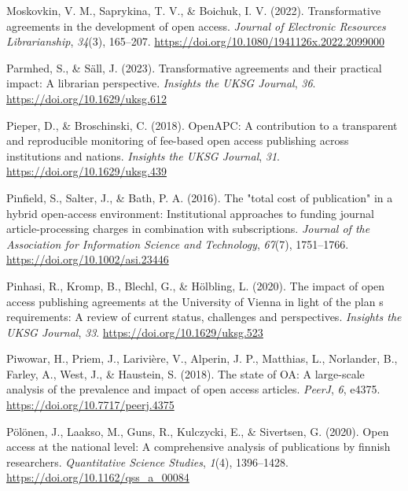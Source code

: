 \documentclass[a4paper,man,floatsintext,longtable,noextraspace,12pt]{apa6}
\newenvironment{CSLReferences}%
  {}%
  {\par}
\begin{document}
\begin{CSLReferences}{1}{0}
\leavevmode{}%
Moskovkin, V. M., Saprykina, T. V., \& Boichuk, I. V. (2022).
Transformative agreements in the development of open access.
\emph{Journal of Electronic Resources Librarianship}, \emph{34}(3),
165--207. \url{https://doi.org/10.1080/1941126x.2022.2099000}

\leavevmode{}%
Parmhed, S., \& Säll, J. (2023). Transformative agreements and their
practical impact: A librarian perspective. \emph{Insights the UKSG
Journal}, \emph{36}. \url{https://doi.org/10.1629/uksg.612}

\leavevmode{}%
Pieper, D., \& Broschinski, C. (2018). {OpenAPC}: A contribution to a
transparent and reproducible monitoring of fee-based open access
publishing across institutions and nations. \emph{Insights the {UKSG}
Journal}, \emph{31}. \url{https://doi.org/10.1629/uksg.439}

\leavevmode{}%
Pinfield, S., Salter, J., \& Bath, P. A. (2016). The "total cost of
publication" in a hybrid open-access environment: Institutional
approaches to funding journal article-processing charges in combination
with subscriptions. \emph{Journal of the Association for Information
Science and Technology}, \emph{67}(7), 1751--1766.
\url{https://doi.org/10.1002/asi.23446}

\leavevmode{}%
Pinhasi, R., Kromp, B., Blechl, G., \& Hölbling, L. (2020). The impact
of open access publishing agreements at the {University of Vienna} in
light of the plan s requirements: A review of current status, challenges
and perspectives. \emph{Insights the UKSG Journal}, \emph{33}.
\url{https://doi.org/10.1629/uksg.523}

\leavevmode{}%
Piwowar, H., Priem, J., Larivière, V., Alperin, J. P., Matthias, L.,
Norlander, B., Farley, A., West, J., \& Haustein, S. (2018). The state
of {OA}: A large-scale analysis of the prevalence and impact of open
access articles. \emph{{PeerJ}}, \emph{6}, e4375.
\url{https://doi.org/10.7717/peerj.4375}

\leavevmode{}%
Pölönen, J., Laakso, M., Guns, R., Kulczycki, E., \& Sivertsen, G.
(2020). Open access at the national level: A comprehensive analysis of
publications by finnish researchers. \emph{Quantitative Science
Studies}, \emph{1}(4), 1396--1428.
\url{https://doi.org/10.1162/qss_a_00084}


\end{CSLReferences}
\end{document}
